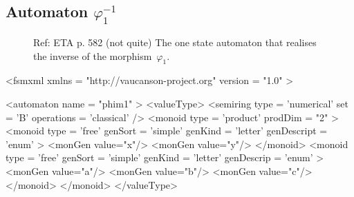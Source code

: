 \subsection{Automaton $\varphi_{1}^{-1}$}
\label{automatonPhim1}

\begin{figure}[h]
  \begin{minipage}[c]{.66\textwidth}
    Ref: ETA p. 582  (not quite)
    The one state automaton that realises the inverse of the morphism~$\varphi_{1}$.
  \end{minipage}
  \begin{minipage}[c]{.34\textwidth}


  \end{minipage}
\end{figure}

{\footnotesize 
\begin{listing}[5]{1}
<fsmxml  xmlns   = "http://vaucanson-project.org" 
         version = "1.0" > 

<automaton name = "phim1" >
  <valueType>
    <semiring  type       = 'numerical'
               set        = 'B'
               operations = 'classical' /> 
    <monoid    type       = 'product'
               prodDim    = "2" > 
      <monoid    type        = 'free'
                 genSort     = 'simple' 
                 genKind     = 'letter' 
                 genDescript = 'enum' > 
        <monGen value="x"/>
        <monGen value="y"/>
      </monoid>
      <monoid    type       = 'free'
                 genSort    = 'simple' 
                 genKind    = 'letter' 
                 genDescrip = 'enum' > 
        <monGen value="a"/>
        <monGen value="b"/>
        <monGen value="c"/>
      </monoid>
    </monoid>
  </valueType>
\end{listing}
}

\newpage 

